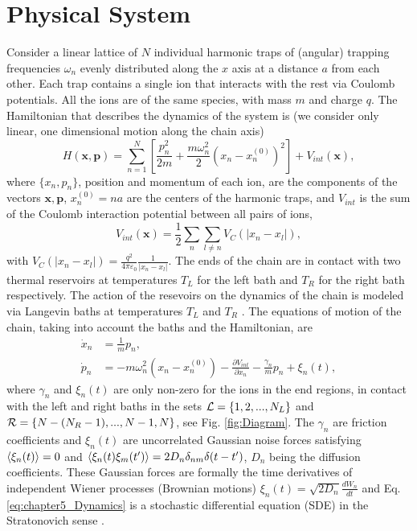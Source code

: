 \section{Physical System\label{sec:chapter5_PhysicalSystem}}
%
%
%
%
Consider a linear lattice of $N$ individual harmonic traps of (angular) trapping frequencies  $\omega_n$ evenly distributed along the $x$ axis at a distance $a$ from each other. Each trap contains a single ion that interacts with the rest via Coulomb potentials. All the ions are of the same species, with mass $m$ and charge $q$. The Hamiltonian that describes the dynamics of the system is (we consider only linear, one dimensional motion along the chain axis)
%
\begin{equation}
    H(\bm{x},\bm{p}) = \sum_{n=1}^N \left[\frac{p_n^2}{2m}  + \frac{m\omega_n^2}{2} (x_n - x_n^{(0)})^2\right] + V_{int}(\bm{x}),
    \label{eq:chapter5_ChainHamiltonian}
\end{equation}
%
where $\{x_n,p_n\}$, position and momentum of each ion, are the components of  the vectors
$\bm{x},\bm{p}$, $x_n^{(0)} = n  a$ are the centers of the harmonic traps, and $V_{int}$ is the sum of the Coulomb interaction potential between all  pairs of ions,
%
\begin{equation}
    V_{int}(\bm{x}) = \frac{1}{2}\sum_n \sum_{l\neq n} V_{C}(\left|x_n-x_l\right|),
    \label{eq:chapter5_InteractionHamiltonian}
\end{equation}
%
with $V_{C}(\left|x_n-x_l\right|) = \frac{q^2}{4\pi\varepsilon_0}\frac{1}{\left|x_n-x_l\right|}$. The ends of the chain are in contact with two thermal reservoirs at temperatures $T_L$ for the left bath and $T_R$ for the right bath respectively. The action of the resevoirs on the dynamics of the chain is modeled via Langevin baths at temperatures $T_L$ and $T_R$ \cite{Lepri2003,Dhar2018}. The equations of motion of the chain, taking into account the baths and the Hamiltonian, are
%
\begin{equation}
    \begin{split}
        \dot{x}_n &= \frac{1}{m}p_n, \\
        \dot{p}_n &= - m\omega_n^2 (x_n-x_n^{(0)}) - \frac{\partial V_{int}}{\partial x_n} - \frac{\gamma_n}{m}p_n + \xi_n(t),
    \end{split}
    \label{eq:chapter5_Dynamics}
\end{equation}
%
where $\gamma_n$ and $\xi_n(t)$ are only non-zero for the ions in the end regions, in contact with the left and right baths in the sets ${\cal L} = \left\{1,2,...,N_L\right\}$ and \linebreak ${\cal R} = \left\{N-(N_R-1),...,N-1,N\right\}$,  see Fig. \ref{fig:Diagram}. The $\gamma_n$ are friction coefficients and $\xi_n(t)$ are uncorrelated Gaussian noise forces satisfying $\expval{ \xi_n(t)} = 0$ and $\expval{ \xi_n(t)\xi_m(t') } = 2 D_n \delta_{nm}\delta(t-t')$, $D_n$ being the diffusion coefficients. These Gaussian forces are formally the time derivatives of independent Wiener processes (Brownian motions)   $\xi_n(t) = \sqrt{2D_n}\frac{dW_n}{dt}$ \cite{Toral2014,Ruiz2014} and Eq. \eqref{eq:chapter5_Dynamics} is a stochastic differential equation (SDE) in the Stratonovich sense \cite{Toral2014}.

